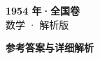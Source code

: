 \documentclass[zihao=-4, a4paper]{ctexart}
\begin{document}
\begin{center}
  {\Large\bfseries 1954 年·全国卷}\\[4pt]
  {\large 数学 · 解析版}
\end{center}
\medskip
{}

\clearpage
{}
\begin{center}{\Large\bfseries 参考答案与详细解析}\end{center}
\medskip

\end{document}
